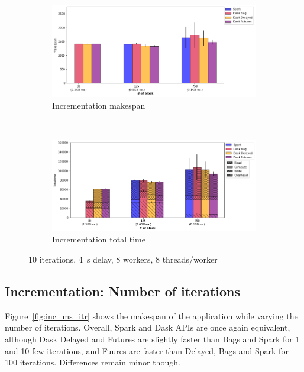 \documentclass[conference]{IEEEtran}
\begin{document}
\begin{figure}[!t]
    \centering
    \begin{subfigure}[b]{\columnwidth}
        \includegraphics[clip,width=\columnwidth]{images/inc_block.png}%
        \caption{Incrementation makespan}\label{fig:inc_ms_block}
    \end{subfigure}
    \\
    \begin{subfigure}[b]{\columnwidth}
        \includegraphics[clip,width=\columnwidth]{images/inc_idle_block.png}%
        \caption{Incrementation total time}\label{fig:inc_tt_block}
    \end{subfigure}
    \caption{10 iterations, \SI{4}{\second} delay, 8 workers, 8
    threads/worker}\label{fig:inc_block}
\end{figure}

\subsection{Incrementation: Number of iterations}
Figure~\ref{fig:inc_ms_itr} shows the makespan of the application while
varying the number of iterations. Overall,  Spark and Dask APIs are once
again equivalent, although Dask Delayed and Futures are slightly faster
than Bags and Spark for 1 and 10 few iterations, and Fuures are faster than
Delayed, Bags and Spark for 100 iterations. Differences remain minor
though.
\end{document}
